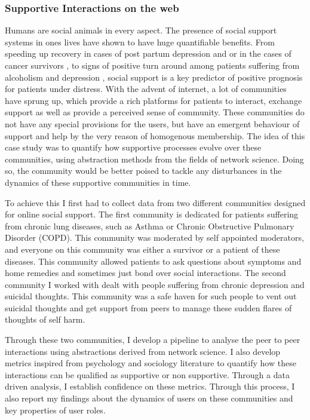 \subsubsection{Supportive Interactions on the web}
Humans are social animals in every aspect. The presence of social support systems in ones lives have shown to have huge quantifiable benefits. From speeding up recovery in cases of post partum depression and or in the cases of cancer survivors\cite{collins1993social,dunkel1984social,baron1990social} , to signs of positive turn around among patients suffering from alcoholism and depression \cite{peirce2000longitudinal,brown1986social}, social support is a key predictor of positive prognosis for patients under distress. With the advent of internet, a lot of communities have sprung up, which provide a rich platforms for patients to interact, exchange support as well as provide a perceived sense of community. These communities do not have any special provisions for the users, but have an emergent behaviour of support and help by the very reason of homogenous membership. The idea of this case study was to quantify how supportive processes evolve over these communities, using abstraction methods from the fields of network science. Doing so, the community would be better poised to tackle any disturbances in the dynamics of these supportive communities in time. 

To achieve this I first had to collect data from two different communities designed for online social support. The first community is dedicated for patients suffering from chronic lung diseases, such as Asthma or Chronic Obstructive Pulmonary Disorder (COPD). This community was moderated by self appointed moderators, and everyone on this community was either a survivor or a patient of these diseases. This community allowed patients to ask questions about symptoms and home remedies and sometimes just bond over social interactions. The second community I worked with dealt with people suffering from chronic depression and suicidal thoughts. This community was a safe haven for such people to vent out suicidal thoughts and get support from peers to manage these sudden flares of thoughts of self harm. 

Through these two communities, I develop a pipeline to analyse the peer to peer interactions using abstractions derived from network science. I also develop metrics inspired from psychology and sociology literature to quantify how these interactions can be qualified as supportive or non supportive. Through a data driven analysis, I establish confidence on these metrics. Through this process, I also report my findings about the dynamics of users on these communities and key properties of user roles. 

